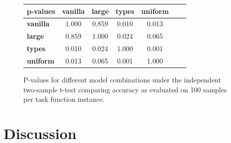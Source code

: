 \documentclass{article} %
\begin{document}
\begin{figure}
    \begin{tabular}{|l|c|c|c|c|c|c|} \hline
        \textbf{p-values}
        & \textbf{vanilla} & \textbf{large} & \textbf{types} & \textbf{uniform} \\ \hline
        \textbf{vanilla} & 1.000 & 0.859 & 0.010 & 0.013 \\ \hline
        \textbf{large} & 0.859 & 1.000 & 0.024 & 0.065 \\ \hline
        \textbf{types} & 0.010 & 0.024 & 1.000 & 0.001 \\ \hline
        \textbf{uniform} & 0.013 & 0.065 & 0.001 & 1.000 \\ \hline
    \end{tabular}
    \caption{P-values for different model combinations under the independent two-sample t-test comparing accuracy as evaluated on 100 samples per task function instance.}
    \label{fig:ttest}
\end{figure}


\section{Discussion} %




\end{document}
